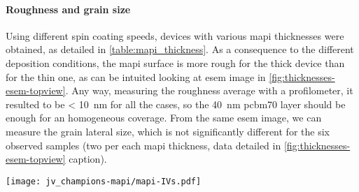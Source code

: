 	\paragraph{Roughness and grain size}
	Using different spin coating speeds, devices with various \gls{mapi} thicknesses were obtained, as detailed in \cref{table:mapi_thickness}.
	As a consequence to the different deposition conditions, the \gls{mapi} surface is more rough for the thick device than for the thin one, as can be intuited looking at \gls{esem} image in \cref{fig:thicknesses-esem-topview}.
	Any way, measuring the roughness average with a profilometer, it resulted to be \SI{< 10}{\nm} for all the cases, so the \SI{40}{\nm} \gls{pcbm70} layer should be enough for an homogeneous coverage.
	From the same \gls{esem} image, we can measure the grain lateral size, which is not significantly different for the six observed samples (two per each \gls{mapi} thickness, data detailed in \cref{fig:thicknesses-esem-topview} caption).

	\begin{SCfigure}
		\centering
		\texttt{[image: jv\_champions-mapi/mapi-IVs.pdf]}
		\label{fig:thicknesses-jv_champions-mapi}
	\end{SCfigure}

